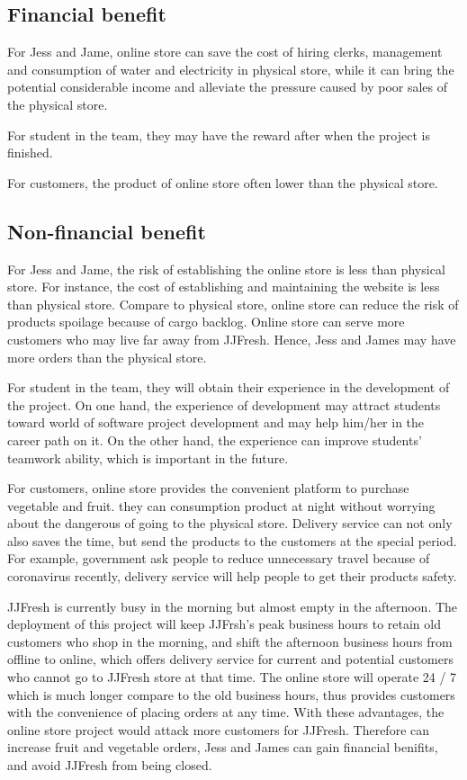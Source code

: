 \documentclass{report}
\begin{document}
\subsection{Financial benefit}



For Jess and Jame, online store can save the cost of hiring clerks, management and consumption of water and electricity in physical store, while it can bring the potential considerable income and alleviate the pressure caused by poor sales of the physical store.

For student in the team, they may have the reward after when the project is finished.

For customers, the product of online store often lower than the physical store.

\subsection{Non-financial benefit}
For Jess and Jame, the risk of establishing the online store is less than physical store. For instance, the cost of establishing and maintaining the website is less than physical store. Compare to physical store, online store can reduce the risk of products spoilage because of cargo backlog. Online store can serve more customers who may live far away from JJFresh. Hence, Jess and James may have more orders than the physical store.

For student in the team, they will obtain their experience in the development of the project. On one hand, the experience of development may attract students toward world of software project development and may help him/her in the career path on it. On the other hand, the experience can improve students' teamwork ability, which is important in the future.

For customers, online store provides the convenient platform to purchase vegetable and fruit. they can consumption product at night without worrying about the dangerous of going to the physical store. Delivery service can not only also saves the time, but send the products to the customers at the special period. For example, government ask people to reduce unnecessary travel because of coronavirus recently, delivery service will help people to get their products safety.

JJFresh is currently busy in the morning but almost empty in the afternoon. The deployment of this project will keep JJFrsh's peak business hours to retain old customers who shop in the morning, and shift the afternoon business hours from offline to online, which offers delivery service for current and potential customers who cannot go to JJFresh store at that time. The online store will operate 24 / 7 which is much longer compare to the old business hours, thus provides customers with the convenience of placing orders at any time. With these advantages, the online store project would attack more customers for JJFresh. Therefore can increase fruit and vegetable orders, Jess and James can gain financial benifits, and avoid JJFresh from being closed.
\end{document}
